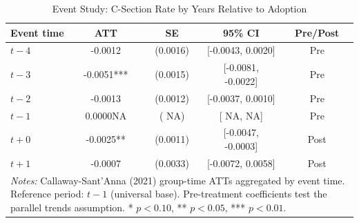 \begin{table}[t]
\centering
\caption{Event Study: C-Section Rate by Years Relative to Adoption}
\label{tab:eventstudy}
\begin{tabular}{lcccc}
\hline\hline
Event time & ATT & SE & 95\% CI & Pre/Post \\
\hline
$t-4$ & -0.0012 & (0.0016) & [-0.0043, 0.0020] & Pre \\
$t-3$ & -0.0051*** & (0.0015) & [-0.0081, -0.0022] & Pre \\
$t-2$ & -0.0013 & (0.0012) & [-0.0037, 0.0010] & Pre \\
$t-1$ & 0.0000NA & (   NA) & [   NA,    NA] & Pre \\
$t+0$ & -0.0025** & (0.0011) & [-0.0047, -0.0003] & Post \\
$t+1$ & -0.0007 & (0.0033) & [-0.0072, 0.0058] & Post \\
\hline\hline
\multicolumn{5}{p{0.85\textwidth}}{\footnotesize \textit{Notes:} Callaway-Sant'Anna (2021) group-time ATTs aggregated by event time. Reference period: $t-1$ (universal base). Pre-treatment coefficients test the parallel trends assumption. * $p<0.10$, ** $p<0.05$, *** $p<0.01$.}
\end{tabular}
\end{table}

